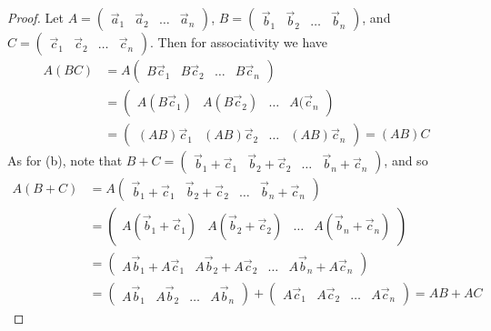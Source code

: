 \documentclass{article}
\theoremstyle{definition}
\theoremstyle{plain}
\theoremstyle{theorem}
\begin{document}
\begin{proof}
	Let $A = \begin{pmatrix} \vec{a}_1 & \vec{a}_2 & \ldots & \vec{a}_n \end{pmatrix}$, $B=\begin{pmatrix} \vec{b}_1 & \vec{b}_2 & \ldots & \vec{b}_n \end{pmatrix}$, and $C = \begin{pmatrix} \vec{c}_1 & \vec{c}_2 & \ldots & \vec{c}_n \end{pmatrix}$. Then for associativity we have
	\begin{align*}
		A(BC) &= A\begin{pmatrix} B\vec{c}_1 & B\vec{c}_2 & \ldots & B\vec{c}_n \end{pmatrix} \\
		&= \begin{pmatrix} A(B\vec{c}_1) & A(B\vec{c}_2) & \ldots & A(\vec{c}_n \end{pmatrix} \\
		&= \begin{pmatrix} (AB)\vec{c}_1 & (AB)\vec{c}_2 & \ldots & (AB)\vec{c}_n \end{pmatrix} = (AB)C
	\end{align*}
	 As for (b), note that $B+C = \begin{pmatrix} \vec{b}_1+\vec{c}_1 & \vec{b}_2+\vec{c}_2 & \ldots & \vec{b}_n+\vec{c}_n \end{pmatrix}$, and so
	\begin{align*} A(B+C) &= A\begin{pmatrix} \vec{b}_1+\vec{c}_1 & \vec{b}_2+\vec{c}_2 & \ldots & \vec{b}_n+\vec{c}_n \end{pmatrix} \\
	&= \begin{pmatrix} A(\vec{b}_1+\vec{c}_1) & A(\vec{b}_2+\vec{c}_2) & \ldots & A(\vec{b}_n+\vec{c}_n) \end{pmatrix} \\
	&= \begin{pmatrix} A\vec{b}_1+A\vec{c}_1 & A\vec{b}_2+A\vec{c}_2 & \ldots & A\vec{b}_n+A\vec{c}_n \end{pmatrix} \\
	&= \begin{pmatrix} A\vec{b}_1 & A\vec{b}_2 & \ldots & A\vec{b}_n \end{pmatrix} + \begin{pmatrix} A\vec{c}_1 & A\vec{c}_2 & \ldots & A\vec{c}_n \end{pmatrix} = AB+AC
	\end{align*}

\end{proof}
\end{document}
